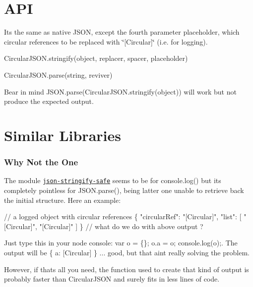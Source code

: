 \section*{A\+PI }

It\textquotesingle{}s the same as native J\+S\+ON, except the fourth parameter {\ttfamily placeholder}, which circular references to be replaced with {\ttfamily \char`\"{}\mbox{[}\+Circular\mbox{]}\char`\"{}} (i.\+e. for logging).


\begin{DoxyItemize}
\item Circular\+J\+S\+O\+N.\+stringify(object, replacer, spacer, placeholder)
\item Circular\+J\+S\+O\+N.\+parse(string, reviver)
\end{DoxyItemize}

Bear in mind {\ttfamily J\+S\+O\+N.\+parse(Circular\+J\+S\+O\+N.\+stringify(object))} will work but not produce the expected output.

\section*{Similar Libraries }

\subsubsection*{Why Not the \href{https://twitter.com/izs}{\tt } One}

The module \href{https://github.com/isaacs/json-stringify-safe}{\tt json-\/stringify-\/safe} seems to be for {\ttfamily console.\+log()} but it\textquotesingle{}s completely pointless for {\ttfamily J\+S\+O\+N.\+parse()}, being latter one unable to retrieve back the initial structure. Here an example\+:


\begin{DoxyCode}
// a logged object with circular references
\{
  "circularRef": "[Circular]",
  "list": [
    "[Circular]",
    "[Circular]"
  ]
\}
// what do we do with above output ?
\end{DoxyCode}


Just type this in your {\ttfamily node} console\+: {\ttfamily var o = \{\}; o.\+a = o; console.\+log(o);}. The output will be {\ttfamily \{ a\+: \mbox{[}Circular\mbox{]} \}} ... good, but that ain\textquotesingle{}t really solving the problem.

However, if that\textquotesingle{}s all you need, the function used to create that kind of output is probably faster than {\ttfamily Circular\+J\+S\+ON} and surely fits in less lines of code.

